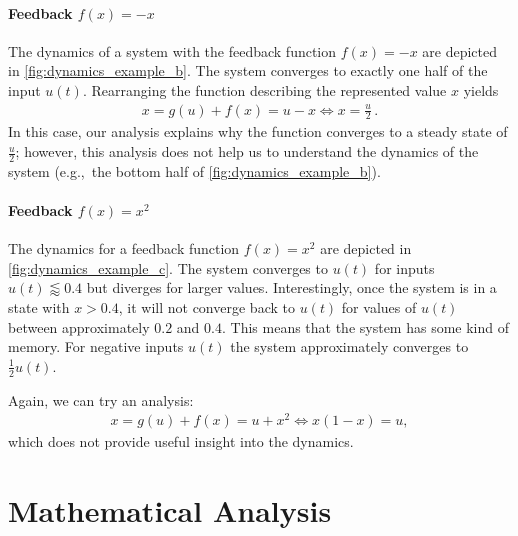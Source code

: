 \documentclass[10pt,letterpaper,oneside]{article}
\begin{document}

\paragraph{Feedback $f(x) = -x$}
The dynamics of a system with the feedback function $f(x) = -x$ are depicted in \cref{fig:dynamics_example_b}. The system converges to exactly one half of the input $u(t)$. Rearranging the function describing the represented value $x$ yields
\begin{align*}
	x = g(u) + f(x) = u - x \Leftrightarrow x = \frac{u}2 \,.
\end{align*}
In this case, our analysis explains why the function converges to a steady state of $\frac{u}2$; however, this analysis does not help us to understand the dynamics of the system (e.g.,~the bottom half of \cref{fig:dynamics_example_b}).

\paragraph{Feedback $f(x) = x^2$}
The dynamics for a feedback function $f(x) = x^2$ are depicted in \cref{fig:dynamics_example_c}. The system converges to $u(t)$ for inputs $u(t) \lessapprox 0.4$ but diverges for larger values. Interestingly, once the system is in a state with $x > 0.4$, it will not converge back to $u(t)$ for values of $u(t)$ between approximately $0.2$ and $0.4$. This means that the system has some kind of memory. For negative inputs $u(t)$ the system approximately converges to $\frac{1}2 u(t)$.

Again, we can try an analysis:
\begin{align*}
  x = g(u) + f(x) = u + x^2 \Leftrightarrow x(1-x) = u,
\end{align*}
which does not provide useful insight into the dynamics.

\section*{Mathematical Analysis}
\end{document}
